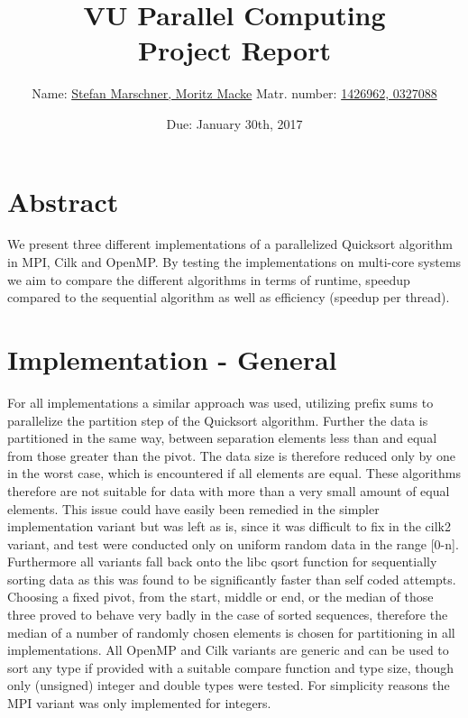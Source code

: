 \documentclass[12pt,a4paper]{article}
\title{VU Parallel Computing\\ 
\Large Project Report}
\author{Name: \underline{Stefan Marschner, Moritz Macke}\qquad
  Matr. number: \underline{1426962, 0327088}}
\date{Due: January 30th, 2017}
\begin{document}
\maketitle
\tableofcontents
\section{Abstract}

We present three different implementations of a parallelized Quicksort algorithm in MPI, Cilk and OpenMP. By testing the implementations on multi-core systems we aim to compare the different algorithms in terms of runtime, speedup compared to the sequential algorithm as well as efficiency (speedup per thread).

\section{Implementation - General}

For all implementations a similar approach was used, utilizing prefix sums to parallelize the partition step of the Quicksort algorithm. Further the data is partitioned in the same way, between separation elements less than and equal from those greater than the pivot. The data size is therefore reduced only by one in the worst case, which is encountered if all elements are equal. These algorithms therefore are not suitable for data with more than a very small amount of equal elements. This issue could have easily been remedied in the simpler implementation variant but was left as is, since it was difficult to fix in the cilk2 variant, and test were conducted only on uniform random data in the range [0-n]. Furthermore all variants fall back onto the libc qsort function for sequentially sorting data as this was found to be significantly faster than self coded attempts. 
Choosing a fixed pivot, from the start, middle or end, or the median of those three proved to behave very badly in the case of sorted sequences, therefore the median of a number of randomly chosen elements is chosen for partitioning in all implementations. 
All OpenMP and Cilk variants are generic and can be used to sort any type if provided with a suitable compare function and type size, though only (unsigned) integer and double types were tested. For simplicity reasons the MPI variant was only implemented for integers.
\end{document}
